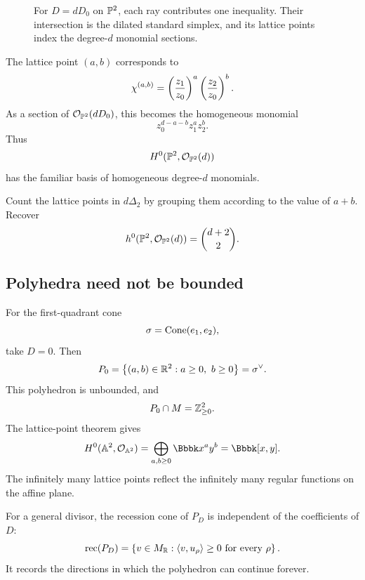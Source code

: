 \begin{example}
\begin{figure}[ht]
\caption{For \(D=dD_0\) on \(\mathbb{P}^2\), each ray contributes one
inequality. Their intersection is the dilated standard simplex, and
its lattice points index the degree-\(d\) monomial sections.}
\label{fig:p2-divisor-polytope-sections}
\end{figure}

The lattice point \((a,b)\) corresponds to
\[
\chi^{(a,b)}
=
\left(\frac{z_1}{z_0}\right)^a
\left(\frac{z_2}{z_0}\right)^b.
\]
As a section of \(\mathcal O_{\mathbb{P}^2}(dD_0)\), this becomes the
homogeneous monomial
\[
z_0^{d-a-b}z_1^az_2^b.
\]
Thus
\[
H^0(\mathbb{P}^2,\mathcal O_{\mathbb{P}^2}(d))
\]
has the familiar basis of homogeneous degree-\(d\) monomials.

\end{example}

\begin{pauseandthink}
Count the lattice points in \(d\Delta_2\) by grouping them according
to the value of \(a+b\). Recover
\[
h^0(\mathbb{P}^2,\mathcal O_{\mathbb{P}^2}(d))
=
\binom{d+2}{2}.
\]
\end{pauseandthink}

\subsection{Polyhedra need not be bounded}

\begin{example}
For the first-quadrant cone
\[
\sigma=\operatorname{Cone}(e_1,e_2),
\]
take \(D=0\). Then
\[
P_0
=
\left\{(a,b)\in\mathbb{R}^2:a\geq0,\ b\geq0\right\}
=
\sigma^\vee.
\]
This polyhedron is unbounded, and
\[
P_0\cap M=\mathbb{Z}_{\geq0}^2.
\]
The lattice-point theorem gives
\[
H^0(\AAA^2,\mathcal O_{\AAA^2})
=
\bigoplus_{a,b\geq0}\Bbbk x^ay^b
=
\Bbbk[x,y].
\]
The infinitely many lattice points reflect the infinitely many
regular functions on the affine plane.
\end{example}

For a general divisor, the recession cone of \(P_D\) is independent
of the coefficients of \(D\):
\[
\operatorname{rec}(P_D)
=
\left\{
 v\in M_{\mathbb{R}}:
 \langle v,u_\rho\rangle\geq0
 \text{ for every }\rho
\right\}.
\]
It records the directions in which the polyhedron can continue
forever.


